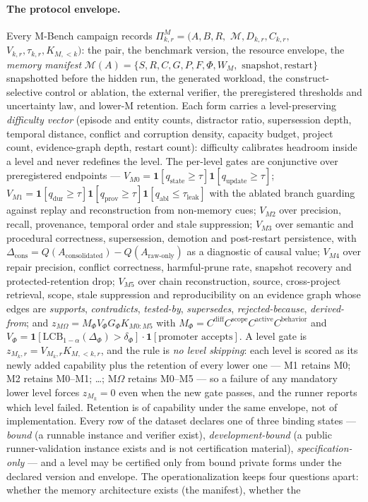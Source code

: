 \paragraph{The protocol envelope.} Every M-Bench campaign records $\Pi^{M}_{k,r} = (A, B, R,$ $\mathcal M, D_{k,r}, C_{k,r},$ $V_{k,r}, \tau_{k,r}, K_{M,<k})$: the pair, the benchmark version, the resource envelope, the \emph{memory manifest} $\mathcal M(A) = \{S, R, C, G, P, F, \Phi, W_M,$ $\text{snapshot}, \text{restart}\}$ snapshotted before the hidden run, the generated workload, the construct-selective control or ablation, the external verifier, the preregistered thresholds and uncertainty law, and lower-M retention. Each form carries a level-preserving \emph{difficulty vector} (episode and entity counts, distractor ratio, supersession depth, temporal distance, conflict and corruption density, capacity budget, project count, evidence-graph depth, restart count): difficulty calibrates headroom inside a level and never redefines the level. The per-level gates are conjunctive over preregistered endpoints --- $V_{M0} = \mathbf 1[q_{\mathrm{state}} \ge \tau]\mathbf 1[q_{\mathrm{update}} \ge \tau]$; $V_{M1} = \mathbf 1[q_{\mathrm{dur}} \ge \tau]\mathbf 1[q_{\mathrm{prov}} \ge \tau]\mathbf 1[q_{\mathrm{abl}} \le \tau_{\mathrm{leak}}]$ with the ablated branch guarding against replay and reconstruction from non-memory cues; $V_{M2}$ over precision, recall, provenance, temporal order and stale suppression; $V_{M3}$ over semantic and procedural correctness, supersession, demotion and post-restart persistence, with $\Delta_{\mathrm{cons}} = Q(A_{\mathrm{consolidated}}) - Q(A_{\mathrm{raw\text{-}only}})$ as a diagnostic of causal value; $V_{M4}$ over repair precision, conflict correctness, harmful-prune rate, snapshot recovery and protected-retention drop; $V_{M5}$ over chain reconstruction, source, cross-project retrieval, scope, stale suppression and reproducibility on an evidence graph whose edges are \emph{supports}, \emph{contradicts}, \emph{tested-by}, \emph{supersedes}, \emph{rejected-because}, \emph{derived-from}; and $z_{M\Omega} = M_\Phi V_\Phi G_\Phi K_{M0{:}M5}$ with $M_\Phi = C^{\mathrm{diff}}C^{\mathrm{scope}}C^{\mathrm{active}}C^{\mathrm{behavior}}$ and $V_\Phi = \mathbf 1[\mathrm{LCB}_{1-\alpha}(\Delta_\Phi) > \delta_\Phi]\cdot\mathbf 1[\text{promoter accepts}]$. A level gate is $z_{M_k,r} = V_{M_k,r} K_{M,<k,r}$, and the rule is \emph{no level skipping}: each level is scored as its newly added capability plus the retention of every lower one --- M1 retains M0; M2 retains M0--M1; \ldots; M$\Omega$ retains M0--M5 --- so a failure of any mandatory lower level forces $z_{M_k} = 0$ even when the new gate passes, and the runner reports which level failed. Retention is of capability under the same envelope, not of implementation. Every row of the dataset declares one of three binding states --- \emph{bound} (a runnable instance and verifier exist), \emph{development-bound} (a public runner-validation instance exists and is not certification material), \emph{specification-only} --- and a level may be certified only from bound private forms under the declared version and envelope. The operationalization keeps four questions apart: whether the memory architecture exists (the manifest), whether the 